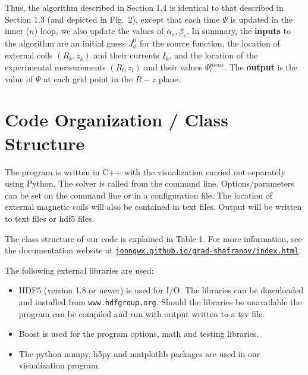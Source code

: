\documentclass[paper=letter, fontsize=11pt]{scrartcl} %
\begin{document}
Thus, the algorithm described in Section 1.4 is identical to that described in Section 1.3 (and depicted in Fig.~2), except that each time $\Psi$ is updated in the inner ($n$) loop, we also update the values of $\alpha_s, \beta_s$.  In summary, the \textbf{inputs} to the algorithm are an initial guess $J_\phi^0$ for the source function, the location of external coils $(R_k,z_k)$ and their currents $I_k$, and the location of the experimental measurements $(R_l,z_l)$ and their values $\Psi_l^{meas}$.  The \textbf{output} is the value of $\Psi$ at each grid point in the $R-z$ plane.  




\section{Code Organization / Class Structure}

The program is written in C++ with the visualization carried out separately using Python. The solver is called from the command line.  Options/parameters can be set on the command line or in a configuration file.  The location of external magnetic coils will also be contained in text files. Output will be written to text files or hdf5 files. 

The class structure of our code is explained in Table 1.  For more information, see the documentation website at \href{http://jonngwx.github.io/grad-shafranov/index.html}{\nolinkurl{jonngwx.github.io/grad-shafranov/index.html}}.

The following external libraries are used:
\begin{itemize}
\item HDF5 (version 1.8 or newer) is used for I/O. The libraries can be downloaded and installed from \texttt{www.hdfgroup.org}. Should the libraries be unavailable the program can be compiled and run with output written to a tsv file. 
\item Boost is used for the program options, math and testing libraries. 
\item The python numpy, h5py and matplotlib packages are used in our visualization program. 
\end{itemize}
\end{document}
